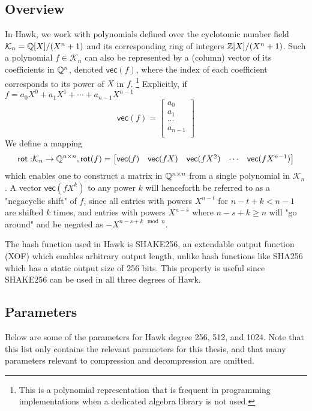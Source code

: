 \subsection{Overview}
In Hawk, we work with polynomials defined over the cyclotomic number field $\mathcal{K}_n = \mathbb{Q}[X]/(X^n +1)$ and its corresponding ring of integers
$\mathbb{Z}[X] / (X^n + 1)$. Such a polynomial $f \in \mathcal{K}_n$ can also be represented by a (column) vector of its coefficients in $\mathbb{Q}^n$, 
denoted $\mathsf{vec}(f)$, where the index of each coefficient corresponds to its power of $X$ in $f$. 
\footnote{This is a polynomial representation that is frequent in programming implementations when a dedicated algebra library is not used.}
Explicitly, if $f = a_0 X^0 + a_1 X^1 + \cdots + a_{n-1} X^{n-1}$
\[
    \mathsf{vec}(f) = 
    \begin{bmatrix}
        a_0 \\
        a_1 \\
        \cdots \\
        a_{n-1} \\
    \end{bmatrix}
\] 
We define a mapping 
\[\mathsf{rot:} \mathcal{K}_n \rightarrow \mathbb{Q}^{n \times n}, \mathsf{rot}(f) = 
\begin{bmatrix} 
    \mathsf{vec}(f) & \mathsf{vec}(fX) & \mathsf{vec}(fX^2) & \cdots & \mathsf{vec}(fX^{n-1})
\end{bmatrix}    
\]
which enables one to construct a matrix in $\mathbb{Q}^{n \times n}$ from a single polynomial in $\mathcal{K}_n$. A vector $\mathsf{vec}(fX^k)$ to any power $k$ will 
henceforth be referred to as a "negacyclic shift" of $f$, since all entries with powers $X^{n-t}$ for $n-t + k  < n-1$ are shifted $k$ times, 
and entries with powers $X^{n-s}$ where $n-s + k \geq n$ will "go around" and be negated as $- X^{n-s +k \mod n}$.

The hash function used in Hawk is SHAKE256, an extendable output function (XOF) which enables arbitrary output length, unlike hash functions like SHA256 which 
has a static output size of 256 bits. This property is useful since SHAKE256 can be used in all three degrees of Hawk.

\subsection{Parameters}
Below are some of the parameters for Hawk degree 256, 512, and 1024. Note that this list only contains the relevant parameters for this thesis, and that many parameters relevant to 
compression and decompression are omitted.

